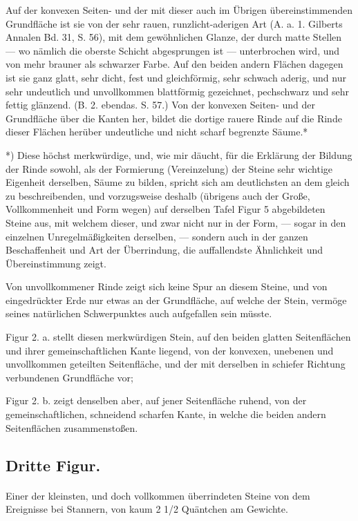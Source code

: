 \documentclass[a4paper, 11pt, oneside, german]{article}
\begin{document}
Auf der konvexen Seiten- und der mit dieser auch im Übrigen übereinstimmenden Grundfläche ist sie von der sehr rauen, runzlicht-aderigen Art (A. a. 1. Gilberts Annalen Bd. 31, S. 56), mit dem gewöhnlichen Glanze, der durch matte Stellen --- wo nämlich die oberste Schicht abgesprungen ist --- unterbrochen wird, und von mehr brauner als schwarzer Farbe. Auf den beiden andern Flächen dagegen ist sie ganz glatt, sehr dicht, fest und gleichförmig, sehr schwach aderig, und nur sehr undeutlich und unvollkommen blattförmig gezeichnet, pechschwarz und sehr fettig glänzend. (B. 2. ebendas. S. 57.) Von der konvexen Seiten- und der Grundfläche über die Kanten her, bildet die dortige rauere Rinde auf die Rinde dieser Flächen herüber undeutliche und nicht scharf begrenzte Säume.*

*) Diese höchst merkwürdige, und, wie mir däucht, für die Erklärung der Bildung der Rinde sowohl, als der Formierung (Vereinzelung) der Steine sehr wichtige Eigenheit derselben, Säume zu bilden, spricht sich am deutlichsten an dem gleich zu beschreibenden, und vorzugsweise deshalb (übrigens auch der Große, Vollkommenheit und Form wegen) auf derselben Tafel Figur 5 abgebildeten Steine aus, mit welchem dieser, und zwar nicht nur in der Form, --- sogar in den einzelnen Unregelmäßigkeiten derselben, --- sondern auch in der ganzen Beschaffenheit und Art der Überrindung, die auffallendste Ähnlichkeit und Übereinstimmung zeigt.

Von unvollkommener Rinde zeigt sich keine Spur an diesem Steine, und von eingedrückter Erde nur etwas an der Grundfläche, auf welche der Stein, vermöge seines natürlichen Schwerpunktes auch aufgefallen sein müsste.

Figur 2. a. stellt diesen merkwürdigen Stein, auf den beiden glatten Seitenflächen und ihrer gemeinschaftlichen Kante liegend, von der konvexen, unebenen und unvollkommen geteilten Seitenfläche, und der mit derselben in schiefer Richtung verbundenen Grundfläche vor;

Figur 2. b. zeigt denselben aber, auf jener Seitenfläche ruhend, von der gemeinschaftlichen, schneidend scharfen Kante, in welche die beiden andern Seitenflächen zusammenstoßen.

\subsection{Dritte Figur.}
\paragraph{}
Einer der kleinsten, und doch vollkommen überrindeten Steine von dem Ereignisse bei Stannern, von kaum 2 1/2 Quäntchen am Gewichte.
\end{document}
